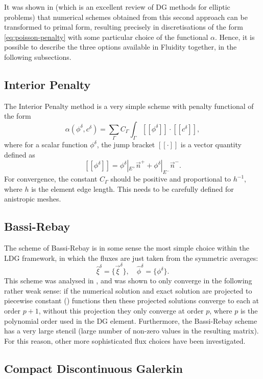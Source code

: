 It was shown in \citet{arnold2002} (which is an excellent review of DG
methods for elliptic problems) that numerical schemes obtained from
this second approach can be transformed to primal form, resulting
precisely in discretisations of the form \eqref{eq:poisson-penalty}
with some particular choice of the functional $\alpha$. Hence, it is
possible to describe the three options available in Fluidity together,
in the following subsections.

\subsection{Interior Penalty}
The Interior Penalty method is a very simple scheme with penalty
functional of the form
\begin{equation}
\label{eq:ip}
\alpha(\phi^\delta,c^\delta) = \sum_{\Gamma}C_{\Gamma}\int_{\Gamma}
[[\phi^\delta]]\cdot[[c^\delta]],
\end{equation}
where for a scalar function $\phi^\delta$, the jump bracket
$[[\cdot]]$ is a vector quantity defined as
\[
[[\phi^\delta]] = \phi^\delta|_{E^+}\vec{n}^+ + \phi^\delta|_{E^-}\vec{n}^-.
\]
For convergence, the constant $C_{\Gamma}$ should be positive and
proportional to $h^{-1}$, where $h$ is the element edge length. This
needs to be carefully defined for anistropic meshes.

\subsection{Bassi-Rebay}
\label{BassiRebay}
The scheme of Bassi-Rebay \citep{bassi1997} is in some sense the most
simple choice within the LDG framework, in which the fluxes are just
taken from the symmetric averages:
\[
\hat{\xi}^\delta = \{\vec{\xi}^\delta\}, \quad
\hat{\phi}^\delta = \{\phi^\delta\}.
\]
This scheme was analysed in \cite{arnold2002}, and was shown to only
converge in the following rather weak sense: if the numerical solution
and exact solution are projected to piecewise constant
(\Pzero) functions then these projected solutions converge to each at order $p+1$,
without this projection they only converge at order $p$, where $p$ is
the polynomial order used in the DG element. Furthermore, the
Bassi-Rebay scheme has a very large stencil (large number of non-zero
values in the resulting matrix). For this reason, other more
sophisticated flux choices have been investigated.

\subsection{Compact Discontinuous Galerkin}
\label{CDG}


